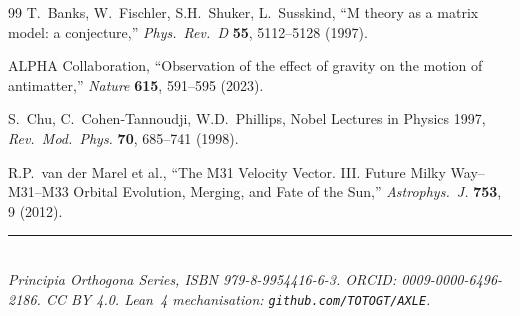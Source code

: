\documentclass[12pt,a4paper]{article}
\theoremstyle{plain}
\theoremstyle{definition}
\theoremstyle{remark}
\begin{document}
\begin{thebibliography}{99}
T.~Banks, W.~Fischler, S.H.~Shuker, L.~Susskind,
``M theory as a matrix model: a conjecture,''
\textit{Phys.\ Rev.\ D} \textbf{55}, 5112--5128 (1997).

ALPHA Collaboration, ``Observation of the effect of gravity on the motion of
antimatter,'' \textit{Nature} \textbf{615}, 591--595 (2023).

S.~Chu, C.~Cohen-Tannoudji, W.D.~Phillips,
Nobel Lectures in Physics 1997,
\textit{Rev.\ Mod.\ Phys.} \textbf{70}, 685--741 (1998).

R.P.~van der Marel et al.,
``The M31 Velocity Vector. III. Future Milky Way--M31--M33 Orbital Evolution,
Merging, and Fate of the Sun,''
\textit{Astrophys.\ J.} \textbf{753}, 9 (2012).

\end{thebibliography}

\vspace{.8em}
\noindent\rule{\linewidth}{0.4pt}\\[.3em]
{\small\textit{Principia Orthogona Series, ISBN 979-8-9954416-6-3.
ORCID: 0009-0000-6496-2186. CC BY 4.0.
Lean~4 mechanisation: \texttt{github.com/TOTOGT/AXLE}.}}
\end{document}
